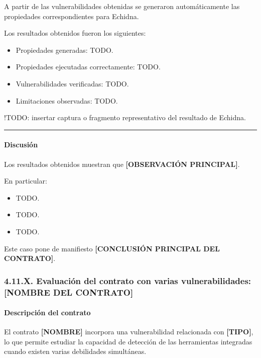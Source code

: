 A partir de las vulnerabilidades obtenidas se generaron automáticamente
las propiedades correspondientes para Echidna.

Los resultados obtenidos fueron los siguientes:

\begin{itemize}
\tightlist
\item
  Propiedades generadas: TODO.
\item
  Propiedades ejecutadas correctamente: TODO.
\item
  Vulnerabilidades verificadas: TODO.
\item
  Limitaciones observadas: TODO.
\end{itemize}

!TODO: insertar captura o fragmento representativo del resultado de
Echidna.

\begin{center}\rule{0.5\linewidth}{0.5pt}\end{center}

\paragraph{Discusión}\label{discusiuxf3n}

Los resultados obtenidos muestran que \textbf{{[}OBSERVACIÓN
PRINCIPAL{]}}.

En particular:

\begin{itemize}
\tightlist
\item
  TODO.
\item
  TODO.
\item
  TODO.
\end{itemize}

Este caso pone de manifiesto \textbf{{[}CONCLUSIÓN PRINCIPAL DEL
CONTRATO{]}}.

\subsubsection{4.11.X. Evaluación del contrato con varias
vulnerabilidades: {[}NOMBRE DEL
CONTRATO{]}}\label{x.-evaluaciuxf3n-del-contrato-con-varias-vulnerabilidades-nombre-del-contrato}

\paragraph{Descripción del
contrato}\label{descripciuxf3n-del-contrato-1}

El contrato \textbf{{[}NOMBRE{]}} incorpora una vulnerabilidad
relacionada con \textbf{{[}TIPO{]}}, lo que permite estudiar la
capacidad de detección de las herramientas integradas cuando existen
varias debilidades simultáneas.

